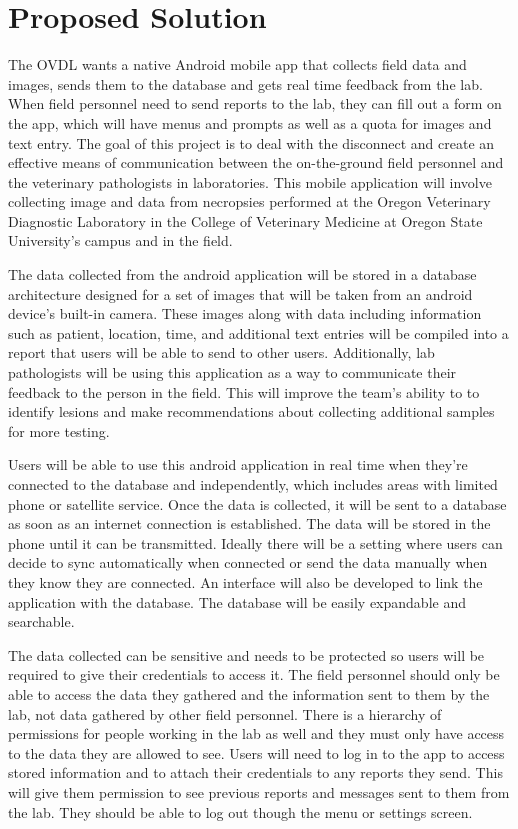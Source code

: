 \documentclass[onecolumn, draftclsnofoot,10pt, compsoc]{IEEEtran}
\begin{document}
\section{Proposed Solution}
The OVDL wants a native Android mobile app that collects field data and images, sends them to the database and gets real time feedback from the lab. When field personnel need to send reports to the lab, they can fill out a form on the app, which will have menus and prompts as well as a quota for images and text entry. The goal of this project is to deal with the disconnect and create an effective means of communication between the on-the-ground field personnel and the veterinary pathologists in laboratories. This mobile application will involve collecting image and data from necropsies performed at the Oregon Veterinary Diagnostic Laboratory in the College of Veterinary Medicine at Oregon State University’s campus and in the field.  

The data collected from the android application will be stored in a database architecture designed for a set of images that will be taken from an android device’s built-in camera. These images along with data including information such as patient, location, time, and additional text entries will be compiled into a report that users will be able to send to other users. Additionally, lab pathologists will be using this application as a way to communicate their feedback to the person in the field. This will improve the team’s ability to to identify lesions and make recommendations about collecting additional samples for more testing.  

Users will be able to use this android application in real time when they’re connected to the database and independently, which includes areas with limited phone or satellite service. Once the data is collected, it will be sent to a database as soon as an internet connection is established. The data will be stored in the phone until it can be transmitted. Ideally there will be a setting where users can decide to sync automatically when connected or send the data manually when they know they are connected. An interface will also be developed to link the application with the database. The database will be easily expandable and searchable. 

The data collected can be sensitive and needs to be protected so users will be required to give their credentials to access it. The field personnel should only be able to access the data they gathered and the information sent to them by the lab, not data gathered by other field personnel. There is a hierarchy of permissions for people working in the lab as well and they must only have access to the data they are allowed to see. Users will need to log in to the app to access stored information and to attach their credentials to any reports they send. This will give them permission to see previous reports and messages sent to them from the lab. They should be able to log out though the menu or settings screen. 
\end{document}
